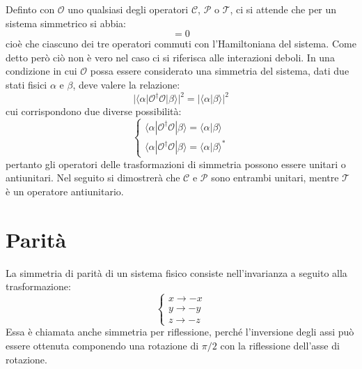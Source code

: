 %
Definto con  $\mathscr{O}$ uno qualsiasi degli operatori  $\mathscr{C}$, $\mathscr{P}$ o $\mathscr{T}$,  ci si attende che per un sistema simmetrico si abbia:
\begin{equation}
[\mathscr{O},\mathscr{H}] = 0
\end{equation}
%
%
cioè che ciascuno dei tre operatori commuti con l'Hamiltoniana del sistema. Come detto però ciò non è vero nel caso ci si riferisca alle interazioni deboli. 
%
In una condizione in cui $\mathscr{O}$ possa essere considerato una simmetria del sistema, dati due stati fisici $\alpha$ e $\beta$, deve valere la relazione:
\begin{equation}
 |\langle\alpha|\mathscr{O}^{\dag}\mathscr{O}|\beta\rangle|^2=|\langle\alpha|\beta\rangle|^2
\end{equation}
%
cui corrispondono due diverse possibilit\`a:
\begin{displaymath}
\left\{
\begin{array}{l}
 \langle\alpha|\mathscr{O}^{\dag}\mathscr{O}|\beta\rangle = \langle\alpha|\beta\rangle \\
 \langle\alpha|\mathscr{O}^{\dag}\mathscr{O}|\beta\rangle = {\langle\alpha|\beta\rangle}^{*}
\end{array}
\right.
\end{displaymath}
%
pertanto gli operatori delle trasformazioni di simmetria possono essere unitari o antiunitari. 
Nel seguito si dimostrerà che $\mathscr{C}$ e $\mathscr{P}$ sono entrambi unitari, mentre $\mathscr{T}$ \`e un operatore antiunitario.

\section{Parità}
\noindent
La simmetria di parit\`a di un sistema fisico consiste nell'invarianza a seguito alla trasformazione:
\begin{displaymath}
\left\{
\begin{array}{l}
x \rightarrow -x\\
y \rightarrow -y\\
z \rightarrow -z
\end{array}
\right.
\end{displaymath}
Essa è chiamata anche simmetria per riflessione, perch\'e l'inversione degli assi pu\`o essere ottenuta componendo una rotazione di $\pi/2$ con la riflessione dell'asse di rotazione.
%
